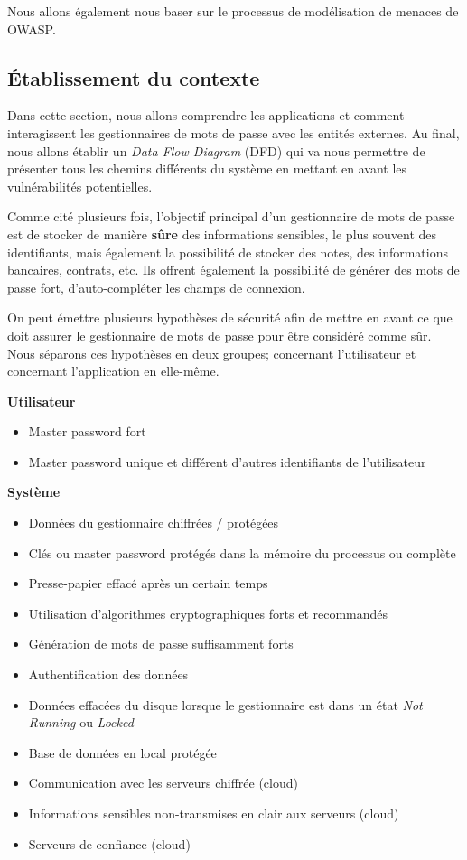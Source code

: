 Nous allons également nous baser sur le processus de modélisation de menaces de OWASP\cite{owasp}.
\subsection{Établissement du contexte}
Dans cette section, nous allons comprendre les applications et comment interagissent les gestionnaires de mots de passe avec les entités externes. Au final, nous allons établir un \textit{Data Flow Diagram} (DFD) qui va nous permettre de présenter tous les chemins différents du système en mettant en avant les vulnérabilités potentielles.

Comme cité plusieurs fois, l'objectif principal d'un gestionnaire de mots de passe est de stocker de manière \textbf{sûre} des informations sensibles, le plus souvent des identifiants, mais également la possibilité de stocker des notes, des informations bancaires, contrats, etc. Ils offrent également la possibilité de générer des mots de passe fort, d'auto-compléter les champs de connexion.

On peut émettre plusieurs hypothèses de sécurité afin de mettre en avant ce que doit assurer le gestionnaire de mots de passe pour être considéré comme sûr. Nous séparons ces hypothèses en deux groupes; concernant l'utilisateur et concernant l'application en elle-même. 

\textbf{Utilisateur}
\begin{itemize}
	\item Master password fort
	\item Master password unique et différent d'autres identifiants de l'utilisateur
\end{itemize}

\textbf{Système}
\begin{itemize}
	\item Données du gestionnaire chiffrées / protégées
	\item Clés ou master password protégés dans la mémoire du processus ou complète
	\item Presse-papier effacé après un certain temps
	\item Utilisation d'algorithmes cryptographiques forts et recommandés
	\item Génération de mots de passe suffisamment forts
	\item Authentification des données
	\item Données effacées du disque lorsque le gestionnaire est dans un état \textit{Not Running} ou \textit{Locked}
	\item Base de données en local protégée
	\item Communication avec les serveurs chiffrée (cloud)
	\item Informations sensibles non-transmises en clair aux serveurs (cloud)
	\item Serveurs de confiance (cloud)
\end{itemize}

